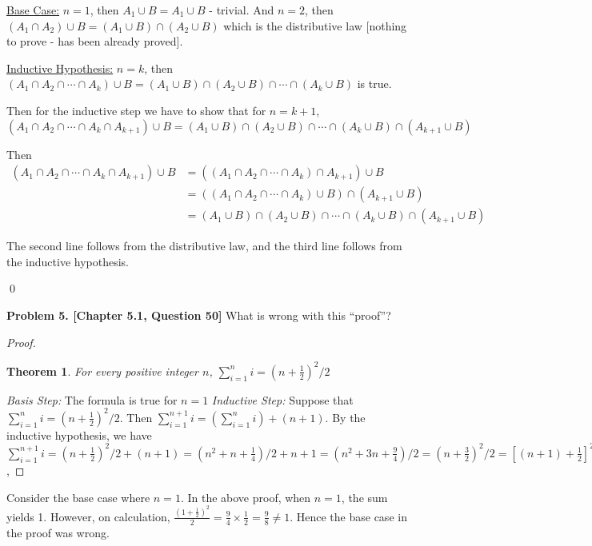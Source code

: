 \documentclass[addpoints]{exam}
\newtheorem{theorem}{Theorem}
\begin{document}
\begin{sloppypar}
\begin{questions}
\begin{solution}
        \underline{Base Case:} $ n = 1 $, then $ A_1 \cup B = A_1 \cup B $ - trivial. And $ n = 2 $, then $ (A_1 \cap A_2) \cup B = (A_1 \cup B) \cap (A_2 \cup B) $ which is the distributive law [nothing to prove - has been already proved].

        \underline{Inductive Hypothesis:} $ n = k $, then $ (A_1 \cap A_2 \cap \cdots \cap A_k) \cup B = (A_1 \cup B) \cap (A_2 \cup B) \cap \cdots \cap (A_k \cup B) $ is true.

        Then for the inductive step we have to show that for $ n = k + 1 $, $ (A_1 \cap A_2 \cap \cdots \cap A_k \cap A_{k + 1}) \cup B = (A_1 \cup B) \cap (A_2 \cup B) \cap \cdots \cap (A_k \cup B) \cap (A_{k + 1} \cup B) $

        Then 
        \begin{equation*}
            \begin{split}
                (A_1 \cap A_2 \cap \cdots \cap A_k \cap A_{k + 1}) \cup B & = ((A_1 \cap A_2 \cap \cdots \cap A_k) \cap A_{k + 1}) \cup B \\ 
                & = ((A_1 \cap A_2 \cap \cdots \cap A_k) \cup B) \cap (A_{k + 1} \cup B) \\ 
                & = (A_1 \cup B) \cap (A_2 \cup B) \cap \cdots \cap (A_k \cup B) \cap (A_{k+1} \cup B)
            \end{split}
        \end{equation*}
        
        The second line follows from the distributive law, and the third line follows from the inductive hypothesis.
        \begin{flushright}
            \qed
        \end{flushright}
    \end{solution}
    
    \question
    \textbf{Problem 5. [Chapter 5.1, Question 50]}
        What is wrong with this ``proof''?
        \begin{proof}
        \begin{theorem}
            For every positive integer $n$, $\sum_{i=1}^{n} i = (n+\frac{1}{2})^2 / 2$
        \end{theorem}
        \textit{Basis Step: } The formula is true for $n=1$
        \newline
        \textit{Inductive Step: } Suppose that $\sum_{i=1}^{n} i = (n+\frac{1}{2})^2 / 2$.
        Then $\sum_{i=1}^{n+1} i = (\sum_{i=1}^{n} i) + (n+1)  $. By the inductive hypothesis, we have 
        $\sum_{i=1}^{n+1} i = (n+\frac{1}{2})^2 / 2 + (n+1) = (n^2 + n + \frac{1}{4})/2 + n + 1 = (n^2 + 3n + \frac{9}{4})/2= (n+\frac{3}{2})^2 /2 = [(n+1)+\frac{1}{2}]^2 /2$, 
        \end{proof}
    \begin{solution}
        Consider the base case where $ n = 1 $. In the above proof, when $ n = 1 $, the sum yields 1. However, on calculation, $ \displaystyle\frac{(1 + \frac{1}{2})^2}{2} = \displaystyle\frac{9}{4} \times \displaystyle\frac{1}{2} = \displaystyle\frac{9}{8} \neq 1 $. Hence the base case in the proof was wrong.
    \end{solution}


\end{questions}
\end{sloppypar}
\end{document}
